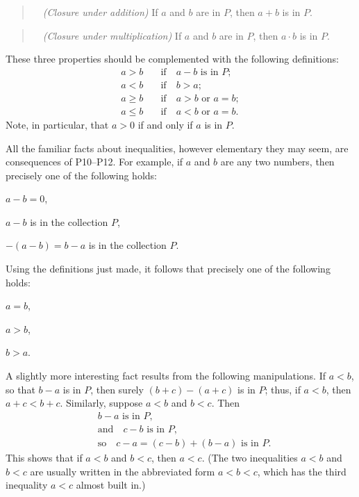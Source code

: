 \begin{quote}
\ \ \textit{(Closure under addition)} If $a$ and $b$ are in $P$,
then $a+b$ is in $P$.
\end{quote}

\begin{quote}
\ \ \textit{(Closure under multiplication)} If $a$ and $b$ are in
$P$, then $a \cdot b$ is in $P$.
\end{quote}

These three properties should be complemented with the following definitions:
\begin{align*}
a > b &\quad\text{if}\quad a - b \text{ is in } P;\\
a < b &\quad\text{if}\quad b > a;\\
a \geq b &\quad\text{if}\quad a > b \text{ or } a = b;\\
a \leq b &\quad\text{if}\quad a < b \text{ or } a = b.
\end{align*}
Note, in particular, that $a>0$ if and only if $a$ is in $P$.

All the familiar facts about inequalities, however elementary they may seem,
are consequences of P10--P12. For example, if $a$ and $b$ are any two
numbers, then precisely one of the following holds:
\begin{romans}
\item $a - b = 0$,
\item $a - b$ is in the collection $P$,
\item $-(a-b) = b - a$ is in the collection $P$.
\end{romans}
Using the definitions just made, it follows that precisely one of the
following holds:
\begin{romans}
\item $a = b$,
\item $a > b$,
\item $b > a$.
\end{romans}

A slightly more interesting fact results from the following manipulations. If
$a<b$, so that $b-a$ is in $P$, then surely $(b+c)-(a+c)$ is in $P$; thus, if
$a<b$, then $a+c<b+c$. Similarly, suppose $a<b$ and $b<c$. Then
\begin{align*}
&b - a \text{ is in } P,\\
&\text{and}\quad c - b \text{ is in } P,\\
&\text{so}\quad c - a = (c-b)+(b-a) \text{ is in } P.
\end{align*}
This shows that if $a<b$ and $b<c$, then $a<c$. (The two inequalities $a<b$
and $b<c$ are usually written in the abbreviated form $a<b<c$, which has the
third inequality $a<c$ almost built in.)


